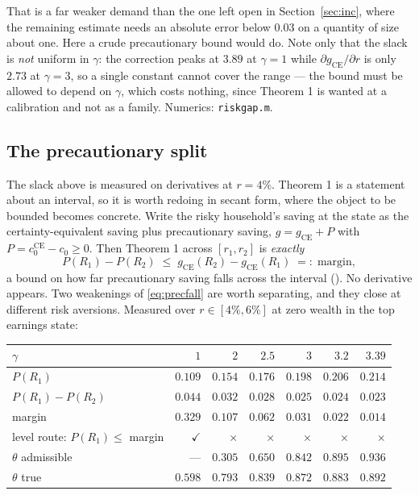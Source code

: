 That is a far weaker demand than the one left open in Section~\ref{sec:inc}, where the remaining
estimate needs an absolute error below $0.03$ on a quantity of size about one. Here a crude
precautionary bound would do. Note only that the slack is \emph{not} uniform in $\gamma$: the
correction peaks at $3.89$ at $\gamma=1$ while $\partial g_{\mathrm{CE}}/\partial r$ is only $2.73$
at $\gamma=3$, so a single constant cannot cover the range --- the bound must be allowed to depend on
$\gamma$, which costs nothing, since Theorem 1 is wanted at a calibration and not as a family.
Numerics: \texttt{riskgap.m}.

\subsection{The precautionary split}

The slack above is measured on derivatives at $r=4\%$. Theorem 1 is a statement about an interval, so
it is worth redoing in secant form, where the object to be bounded becomes concrete. Write the risky
household's saving at the state as the certainty-equivalent saving plus precautionary saving,
$g=g_{\mathrm{CE}}+P$ with $P=c_0^{\mathrm{CE}}-c_0\ge0$. Then Theorem 1 across $[r_1,r_2]$ is
\emph{exactly}
\begin{equation}\label{eq:precfall}
  P(R_1)-P(R_2)\;\le\;g_{\mathrm{CE}}(R_2)-g_{\mathrm{CE}}(R_1)\;=:\;\text{margin},
  \tag{P}
\end{equation}
a bound on how far precautionary saving falls across the interval
(). No derivative appears. Two weakenings
of \eqref{eq:precfall} are worth separating, and they close at different risk aversions. Measured over
$r\in[4\%,6\%]$ at zero wealth in the top earnings state:

\begin{center}
\begin{tabular}{lrrrrrr}
\toprule
$\gamma$ & $1$ & $2$ & $2.5$ & $3$ & $3.2$ & $3.39$\\
\midrule
$P(R_1)$ & $0.109$ & $0.154$ & $0.176$ & $0.198$ & $0.206$ & $0.214$\\
$P(R_1)-P(R_2)$ & $0.044$ & $0.032$ & $0.028$ & $0.025$ & $0.024$ & $0.023$\\
margin & $0.329$ & $0.107$ & $0.062$ & $0.031$ & $0.022$ & $0.014$\\
\midrule
level route: $P(R_1)\le$ margin & $\checkmark$ & $\times$ & $\times$ & $\times$ & $\times$ & $\times$\\
$\theta$ admissible & --- & $0.305$ & $0.650$ & $0.842$ & $0.895$ & $0.936$\\
$\theta$ true & $0.598$ & $0.793$ & $0.839$ & $0.872$ & $0.883$ & $0.892$\\
\bottomrule
\end{tabular}
\end{center}

